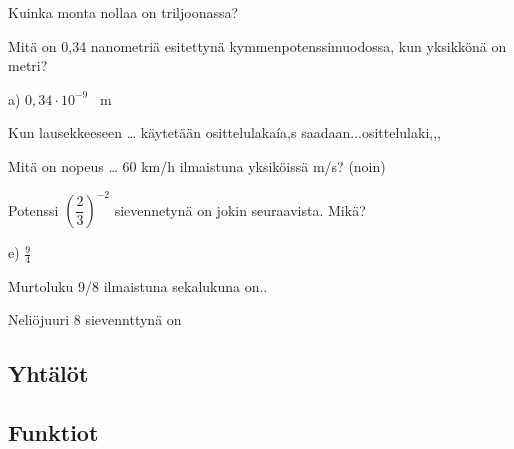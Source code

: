 \begin{tehtava}
Kuinka monta nollaa on triljoonassa?
\begin{alakohdat}
\end{alakohdat}
\end{tehtava}

\begin{tehtava}
Mitä on 0,34 nanometriä esitettynä kymmenpotenssimuodossa, kun yksikkönä on metri?
\begin{alakohdat}
\end{alakohdat}
\begin{vastaus}
a) $0,34 \cdot 10^{-9}$ \, m
\end{vastaus}
\end{tehtava}

\begin{tehtava}
Kun lausekkeeseen … käytetään osittelulakaía,s saadaan...osittelulaki,,,
\end{tehtava}

\begin{tehtava}
Mitä on nopeus … 60 km/h ilmaistuna yksiköissä m/s? (noin)
\begin{alakohdat}
\end{alakohdat}
\end{tehtava}

\begin{tehtava}
Potenssi $\left( \dfrac{2}{3} \right)^{-2}$ sievennetynä on jokin seuraavista. Mikä?
\begin{alakohdat}
\end{alakohdat}
\begin{vastaus}
e) $\frac{9}{4}$
\end{vastaus}
\end{tehtava}

\begin{tehtava}
Murtoluku 9/8 ilmaistuna sekalukuna on..
\begin{alakohdat}
\end{alakohdat}
\end{tehtava}

\begin{tehtava}
Neliöjuuri 8 sievennttynä on
\begin{alakohdat}
\end{alakohdat}
\end{tehtava}

\subsection*{Yhtälöt}

\subsection*{Funktiot}
